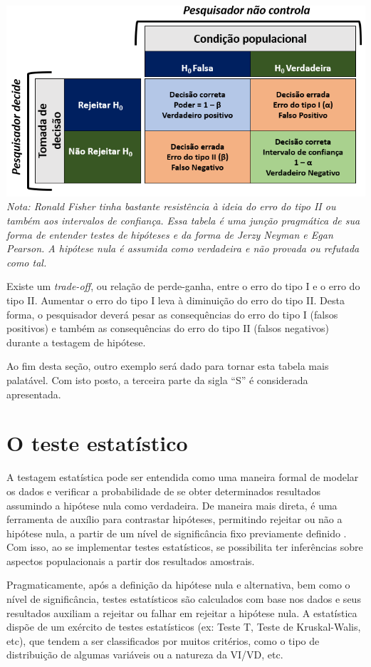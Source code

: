 \documentclass[
]{book}
\begin{document}
\includegraphics{./img/cap_inferencia_tabela_decisao.png}
\emph{Nota: Ronald Fisher tinha bastante resistência à ideia do erro do tipo II ou também aos intervalos de confiança. Essa tabela é uma junção pragmática de sua forma de entender testes de hipóteses e da forma de Jerzy Neyman e Egan Pearson. A hipótese nula é assumida como verdadeira e não provada ou refutada como tal.}

Existe um \emph{trade-off}, ou relação de perde-ganha, entre o erro do tipo I e o erro do tipo II. Aumentar o erro do tipo I leva à diminuição do erro do tipo II. Desta forma, o pesquisador deverá pesar as consequências do erro do tipo I (falsos positivos) e também as consequências do erro do tipo II (falsos negativos) durante a testagem de hipótese.

Ao fim desta seção, outro exemplo será dado para tornar esta tabela mais palatável. Com isto posto, a terceira parte da sigla ``S'' é considerada apresentada.

\hypertarget{o-teste-estatuxedstico}{%
\section{O teste estatístico}\label{o-teste-estatuxedstico}}

A testagem estatística pode ser entendida como uma maneira formal de modelar os dados e verificar a probabilidade de se obter determinados resultados assumindo a hipótese nula como verdadeira. De maneira mais direta, é uma ferramenta de auxílio para contrastar hipóteses, permitindo rejeitar ou não a hipótese nula, a partir de um nível de significância fixo previamente definido \citep{Lecoutre2014}. Com isso, ao se implementar testes estatísticos, se possibilita ter inferências sobre aspectos populacionais a partir dos resultados amostrais.

Pragmaticamente, após a definição da hipótese nula e alternativa, bem como o nível de significância, testes estatísticos são calculados com base nos dados e seus resultados auxiliam a rejeitar ou falhar em rejeitar a hipótese nula. A estatística dispõe de um exército de testes estatísticos (ex: Teste T, Teste de Kruskal-Walis, etc), que tendem a ser classificados por muitos critérios, como o tipo de distribuição de algumas variáveis ou a natureza da VI/VD, etc.
\end{document}
